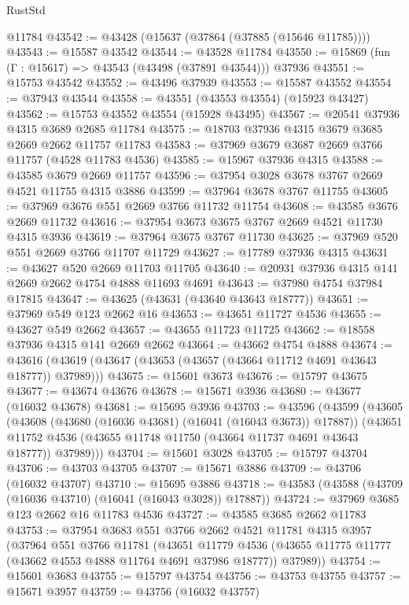 \begin{lexlean}{RustStd}
\begin{coremodule}
    @11784
@43542 := @43428 (@15637 (@37864 (@37885 (@15646 @11785))))
@43543 := @15587 @43542
@43544 := @43528 @11784
@43550 := @15869 (fun (Γ : @15617) => @43543 (@43498 (@37891 @43544))) @37936
@43551 := @15753 @43542
@43552 := @43496 @37939
@43553 := @15587 @43552
@43554 := @37943 @43544
@43558 := @43551 (@43553 @43554) (@15923 @43427)
@43562 := @15753 @43552 @43554 (@15928 @43495)
@43567 := @20541 @37936 @4315 @3689 @2685 @11784
@43575 := @18703 @37936 @4315 @3679 @3685 @2669 @2662 @11757 @11783
@43583 := @37969 @3679 @3687 @2669 @3766 @11757 (@4528 @11783 @4536)
@43585 := @15967 @37936 @4315
@43588 := @43585 @3679 @2669 @11757
@43596 := @37954 @3028 @3678 @3767 @2669 @4521 @11755 @4315 @3886
@43599 := @37964 @3678 @3767 @11755
@43605 := @37969 @3676 @551 @2669 @3766 @11732 @11754
@43608 := @43585 @3676 @2669 @11732
@43616 := @37954 @3673 @3675 @3767 @2669 @4521 @11730 @4315 @3936
@43619 := @37964 @3675 @3767 @11730
@43625 := @37969 @520 @551 @2669 @3766 @11707 @11729
@43627 := @17789 @37936 @4315
@43631 := @43627 @520 @2669 @11703 @11705
@43640 := @20931 @37936 @4315 @141 @2669 @2662 @4754 @4888 @11693 @4691
@43643 := @37980 @4754 @37984 @17815
@43647 := @43625 (@43631 (@43640 @43643 @18777))
@43651 := @37969 @549 @123 @2662 @16
@43653 := @43651 @11727 @4536
@43655 := @43627 @549 @2662
@43657 := @43655 @11723 @11725
@43662 := @18558 @37936 @4315 @141 @2669 @2662
@43664 := @43662 @4754 @4888
@43674 := @43616 (@43619 (@43647 (@43653 (@43657 (@43664 @11712 @4691 @43643 @18777)) @37989)))
@43675 := @15601 @3673
@43676 := @15797 @43675
@43677 := @43674 @43676
@43678 := @15671 @3936
@43680 := @43677 (@16032 @43678)
@43681 := @15695 @3936
@43703 := @43596
    (@43599
      (@43605
        (@43608 (@43680 (@16036 @43681) (@16041 (@16043 @3673)) @17887))
        (@43651 @11752 @4536 (@43655 @11748 @11750 (@43664 @11737 @4691 @43643 @18777)) @37989)))
@43704 := @15601 @3028
@43705 := @15797 @43704
@43706 := @43703 @43705
@43707 := @15671 @3886
@43709 := @43706 (@16032 @43707)
@43710 := @15695 @3886
@43718 := @43583 (@43588 (@43709 (@16036 @43710) (@16041 (@16043 @3028)) @17887))
@43724 := @37969 @3685 @123 @2662 @16 @11783 @4536
@43727 := @43585 @3685 @2662 @11783
@43753 := @37954
    @3683
    @551
    @3766
    @2662
    @4521
    @11781
    @4315
    @3957
    (@37964
      @551
      @3766
      @11781
      (@43651
        @11779
        @4536
        (@43655 @11775 @11777 (@43662 @4553 @4888 @11764 @4691 @37986 @18777))
        @37989))
@43754 := @15601 @3683
@43755 := @15797 @43754
@43756 := @43753 @43755
@43757 := @15671 @3957
@43759 := @43756 (@16032 @43757)

\end{coremodule}
\end{lexlean}
